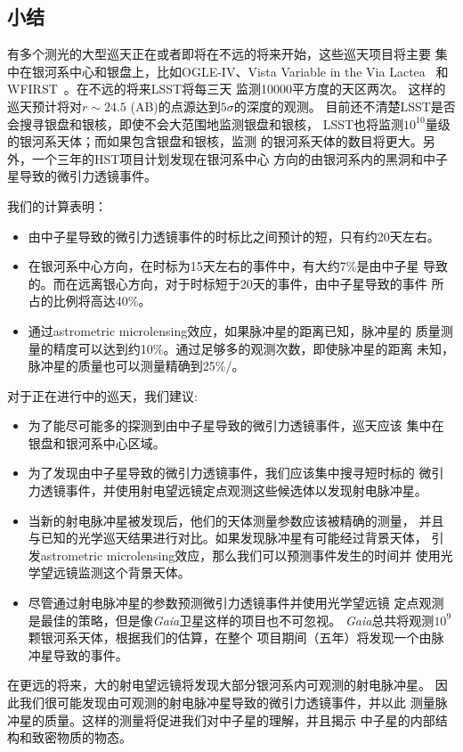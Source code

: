 \subsection{小结}

有多个测光的大型巡天正在或者即将在不远的将来开始，这些巡天项目将主要
集中在银河系中心和银盘上，比如OGLE-IV、Vista Variable in the Via Lactea~\supercite{Minniti} 
和WFIRST~\supercite{Spergel}。在不远的将来LSST\supercite{ivez}将每三天
监测10000平方度的天区两次。
这样的巡天预计将对$r\sim24.5$ (AB)的点源达到$5\sigma$的深度的观测。
目前还不清楚LSST是否会搜寻银盘和银核，即使不会大范围地监测银盘和银核，
LSST也将监测$10^{10}$量级的银河系天体；而如果包含银盘和银核，监测
的银河系天体的数目将更大。另外，一个三年的HST项目计划发现在银河系中心
方向的由银河系内的黑洞和中子星导致的微引力透镜事件\supercite{sahu}。

我们的计算表明：
\begin{itemize}
\item 由中子星导致的微引力透镜事件的时标比之间预计的短，只有约20天左右。
\item 在银河系中心方向，在时标为15天左右的事件中，有大约7\%是由中子星
导致的。而在远离银心方向，对于时标短于20天的事件，由中子星导致的事件
所占的比例将高达40\%。
\item 通过astrometric microlensing效应，如果脉冲星的距离已知，脉冲星的
质量测量的精度可以达到约10\%。通过足够多的观测次数，即使脉冲星的距离
未知，脉冲星的质量也可以测量精确到25\%/。
\end{itemize}

对于正在进行中的巡天，我们建议:
\begin{itemize}
\item 为了能尽可能多的探测到由中子星导致的微引力透镜事件，巡天应该
集中在银盘和银河系中心区域。
\item 为了发现由中子星导致的微引力透镜事件，我们应该集中搜寻短时标的
微引力透镜事件，并使用射电望远镜定点观测这些候选体以发现射电脉冲星。
\item 当新的射电脉冲星被发现后，他们的天体测量参数应该被精确的测量，
并且与已知的光学巡天结果进行对比。如果发现脉冲星有可能经过背景天体，
引发astrometric microlensing效应，那么我们可以预测事件发生的时间并
使用光学望远镜监测这个背景天体。
\item 尽管通过射电脉冲星的参数预测微引力透镜事件并使用光学望远镜
定点观测是最佳的策略，但是像\textit{Gaia}卫星这样的项目也不可忽视。
\textit{Gaia}总共将观测$10^9$颗银河系天体，根据我们的估算，在整个
项目期间（五年）将发现一个由脉冲星导致的事件。
\end{itemize}

在更远的将来，大的射电望远镜将发现大部分银河系内可观测的射电脉冲星。
因此我们很可能发现由可观测的射电脉冲星导致的微引力透镜事件，并以此
测量脉冲星的质量。这样的测量将促进我们对中子星的理解，并且揭示
中子星的内部结构和致密物质的物态。

\pkuthssffaq

